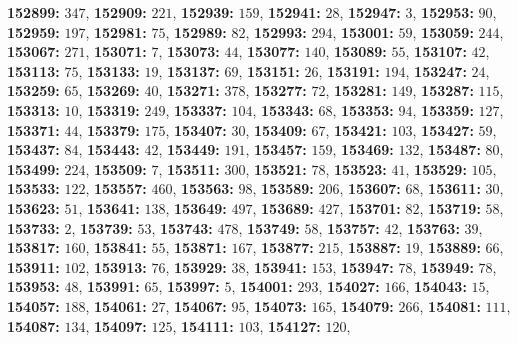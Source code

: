 \textsf{\bfseries 152899:} $347$, \textsf{\bfseries 152909:} $221$, \textsf{\bfseries 152939:} $159$, \textsf{\bfseries 152941:} $28$, \textsf{\bfseries 152947:} $3$, \textsf{\bfseries 152953:} $90$, \textsf{\bfseries 152959:} $197$, \textsf{\bfseries 152981:} $75$, \textsf{\bfseries 152989:} $82$, \textsf{\bfseries 152993:} $294$, \textsf{\bfseries 153001:} $59$, \textsf{\bfseries 153059:} $244$, \textsf{\bfseries 153067:} $271$, \textsf{\bfseries 153071:} $7$, \textsf{\bfseries 153073:} $44$, \textsf{\bfseries 153077:} $140$, \textsf{\bfseries 153089:} $55$, \textsf{\bfseries 153107:} $42$, \textsf{\bfseries 153113:} $75$, \textsf{\bfseries 153133:} $19$, \textsf{\bfseries 153137:} $69$, \textsf{\bfseries 153151:} $26$, \textsf{\bfseries 153191:} $194$, \textsf{\bfseries 153247:} $24$, \textsf{\bfseries 153259:} $65$, \textsf{\bfseries 153269:} $40$, \textsf{\bfseries 153271:} $378$, \textsf{\bfseries 153277:} $72$, \textsf{\bfseries 153281:} $149$, \textsf{\bfseries 153287:} $115$, \textsf{\bfseries 153313:} $10$, \textsf{\bfseries 153319:} $249$, \textsf{\bfseries 153337:} $104$, \textsf{\bfseries 153343:} $68$, \textsf{\bfseries 153353:} $94$, \textsf{\bfseries 153359:} $127$, \textsf{\bfseries 153371:} $44$, \textsf{\bfseries 153379:} $175$, \textsf{\bfseries 153407:} $30$, \textsf{\bfseries 153409:} $67$, \textsf{\bfseries 153421:} $103$, \textsf{\bfseries 153427:} $59$, \textsf{\bfseries 153437:} $84$, \textsf{\bfseries 153443:} $42$, \textsf{\bfseries 153449:} $191$, \textsf{\bfseries 153457:} $159$, \textsf{\bfseries 153469:} $132$, \textsf{\bfseries 153487:} $80$, \textsf{\bfseries 153499:} $224$, \textsf{\bfseries 153509:} $7$, \textsf{\bfseries 153511:} $300$, \textsf{\bfseries 153521:} $78$, \textsf{\bfseries 153523:} $41$, \textsf{\bfseries 153529:} $105$, \textsf{\bfseries 153533:} $122$, \textsf{\bfseries 153557:} $460$, \textsf{\bfseries 153563:} $98$, \textsf{\bfseries 153589:} $206$, \textsf{\bfseries 153607:} $68$, \textsf{\bfseries 153611:} $30$, \textsf{\bfseries 153623:} $51$, \textsf{\bfseries 153641:} $138$, \textsf{\bfseries 153649:} $497$, \textsf{\bfseries 153689:} $427$, \textsf{\bfseries 153701:} $82$, \textsf{\bfseries 153719:} $58$, \textsf{\bfseries 153733:} $2$, \textsf{\bfseries 153739:} $53$, \textsf{\bfseries 153743:} $478$, \textsf{\bfseries 153749:} $58$, \textsf{\bfseries 153757:} $42$, \textsf{\bfseries 153763:} $39$, \textsf{\bfseries 153817:} $160$, \textsf{\bfseries 153841:} $55$, \textsf{\bfseries 153871:} $167$, \textsf{\bfseries 153877:} $215$, \textsf{\bfseries 153887:} $19$, \textsf{\bfseries 153889:} $66$, \textsf{\bfseries 153911:} $102$, \textsf{\bfseries 153913:} $76$, \textsf{\bfseries 153929:} $38$, \textsf{\bfseries 153941:} $153$, \textsf{\bfseries 153947:} $78$, \textsf{\bfseries 153949:} $78$, \textsf{\bfseries 153953:} $48$, \textsf{\bfseries 153991:} $65$, \textsf{\bfseries 153997:} $5$, \textsf{\bfseries 154001:} $293$, \textsf{\bfseries 154027:} $166$, \textsf{\bfseries 154043:} $15$, \textsf{\bfseries 154057:} $188$, \textsf{\bfseries 154061:} $27$, \textsf{\bfseries 154067:} $95$, \textsf{\bfseries 154073:} $165$, \textsf{\bfseries 154079:} $266$, \textsf{\bfseries 154081:} $111$, \textsf{\bfseries 154087:} $134$, \textsf{\bfseries 154097:} $125$, \textsf{\bfseries 154111:} $103$, \textsf{\bfseries 154127:} $120$, 
